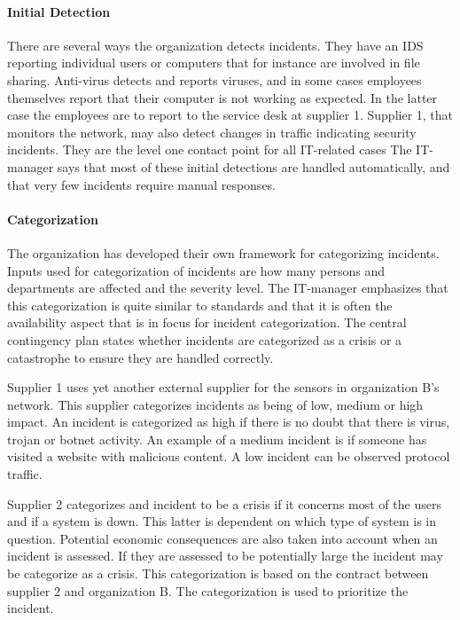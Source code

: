 \paragraph{Initial Detection}
There are several ways the organization detects incidents. They have an \ac{IDS} reporting individual users or computers that for instance are involved in file sharing. Anti-virus detects and reports viruses, and in some cases employees themselves report that their computer is not working as expected. In the latter case the employees are to report to the service desk at supplier 1. Supplier 1, that monitors the network, may also detect changes in traffic indicating security incidents. They are the level one contact point for all IT-related cases The IT-manager says that most of these initial detections are handled automatically, and that very few incidents require manual responses. 

\paragraph{Categorization}
The organization has developed their own framework for categorizing incidents. Inputs used for categorization of incidents are how many persons and departments are affected and the severity level. The IT-manager emphasizes that this categorization is quite similar to standards and that it is often the availability aspect that is in focus for incident categorization. The central contingency plan states whether incidents are categorized as a crisis or a catastrophe to ensure they are handled correctly.

Supplier 1 uses yet another external supplier for the sensors in organization B's network. This supplier categorizes incidents as being of low, medium or high impact. An incident is categorized as high if there is no doubt that there is virus, trojan or botnet activity. An example of a medium incident is if someone has visited a website with malicious content. A low incident can be observed protocol traffic.

Supplier 2 categorizes and incident to be a crisis if it concerns most of the users and if a system is down. This latter is dependent on which type of system is in question. Potential economic consequences are also taken into account when an incident is assessed. If they are assessed to be potentially large the incident may be categorize as a crisis. This categorization is based on the contract between supplier 2 and organization B. The categorization is used to prioritize the incident.

